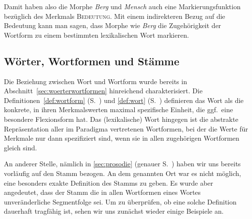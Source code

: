 \begin{exe}
  \ex\label{ex:morph0815}
  \begin{xlist}
  \end{xlist}
\end{exe}

Damit haben also die Morphe \textit{Berg} und \textit{Mensch} auch eine Markierungsfunktion bezüglich des Merkmals \textsc{Bedeutung}.
Mit einem indirekteren Bezug auf die Bedeutung kann man sagen, dass Morphe wie \textit{Berg} die Zugehörigkeit der Wortform zu einem bestimmten lexikalischen Wort markieren.

\subsection{Wörter, Wortformen und Stämme}

\label{sec:stamm}


Die Beziehung zwischen Wort und Wortform wurde bereits in Abschnitt~\ref{sec:woerterwortformen} hinreichend charakterisiert.
Die Definitionen~\ref{def:wortform} (S.~\pageref{def:wortform}) und \ref{def:wort} (S.~\pageref{def:wort}) definieren das Wort als die konkrete, in ihren Merkmalswerten maximal spezifische Einheit, die ggf.\ eine besondere Flexionsform hat.
Das (lexikalische) Wort hingegen ist die abstrakte Repräsentation aller im Paradigma vertretenen Wortformen, bei der die Werte für Merkmale nur dann spezifiziert sind, wenn sie in allen zugehörigen Wortformen gleich sind.

An anderer Stelle, nämlich in \ref{sec:prosodie} (genauer S.~\pageref{abs:3453457}) haben wir uns bereits vorläufig auf den Stamm bezogen.
An dem genannten Ort war es nicht möglich, eine besonders exakte Definition des Stamms zu geben.
Es wurde aber angedeutet, dass der Stamm die in allen Wortformen eines Wortes unveränderliche Segmentfolge sei.
Um zu überprüfen, ob eine solche Definition dauerhaft tragfähig ist, sehen wir uns zunächst wieder einige Beispiele an.


